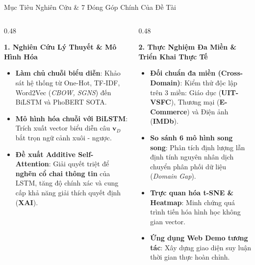 \documentclass[aspectratio=169, 10pt]{beamer}
\begin{document}
\begin{frame}{Mục Tiêu Nghiên Cứu \& 7 Đóng Góp Chính Của Đề Tài}
  \begin{columns}[T, onlytextwidth]
    \begin{column}{0.48\textwidth}
      \begin{block}{\small\textbf{1. Nghiên Cứu Lý Thuyết \& Mô Hình Hóa}}
        \fontsize{8}{10.5}\selectfont
        \begin{itemize}\setlength{\itemsep}{0.3em}
          \item \textbf{Làm chủ chuỗi biểu diễn}: Khảo sát hệ thống từ One-Hot, TF-IDF, Word2Vec (\textit{CBOW, SGNS}) đến BiLSTM và PhoBERT SOTA.
          \item \textbf{Mô hình hóa chuỗi với BiLSTM}: Trích xuất vector biểu diễn câu $\mathbf{v}_D$ bắt trọn ngữ cảnh xuôi - ngược.
          \item \textbf{Đề xuất Additive Self-Attention}: Giải quyết triệt để \textbf{nghẽn cổ chai thông tin} của LSTM, tăng độ chính xác và cung cấp khả năng giải thích quyết định (\textbf{XAI}).
        \end{itemize}
      \end{block}
    \end{column}
    \hfill
    \begin{column}{0.48\textwidth}
      \begin{block}{\small\textbf{2. Thực Nghiệm Đa Miền \& Triển Khai Thực Tế}}
        \fontsize{8}{10.5}\selectfont
        \begin{itemize}\setlength{\itemsep}{0.25em}
          \item \textbf{Đối chuẩn đa miền (Cross-Domain)}: Kiểm thử độc lập trên 3 miền: Giáo dục (\textbf{UIT-VSFC}), Thương mại (\textbf{E-Commerce}) và Điện ảnh (\textbf{IMDb}).
          \item \textbf{So sánh 6 mô hình song song}: Phân tích định lượng lẫn định tính nguyên nhân dịch chuyển phân phối dữ liệu (\textit{Domain Gap}).
          \item \textbf{Trực quan hóa t-SNE \& Heatmap}: Minh chứng quá trình tiến hóa hình học không gian vector.
          \item \textbf{Ứng dụng Web Demo tương tác}: Xây dựng giao diện suy luận thời gian thực hoàn chỉnh.
        \end{itemize}
      \end{block}
    \end{column}
  \end{columns}
\end{frame}
\end{document}

